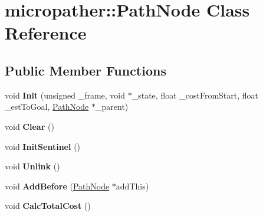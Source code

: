 \hypertarget{classmicropather_1_1_path_node}{\section{micropather\-:\-:Path\-Node Class Reference}
\label{classmicropather_1_1_path_node}
}
\subsection*{Public Member Functions}
\begin{DoxyCompactItemize}
\item 
\hypertarget{classmicropather_1_1_path_node_a7a0c5d4f08124f71a57a78e83d391e90}{void {\bfseries Init} (unsigned \-\_\-frame, void $\ast$\-\_\-state, float \-\_\-cost\-From\-Start, float \-\_\-est\-To\-Goal, \hyperlink{classmicropather_1_1_path_node}{Path\-Node} $\ast$\-\_\-parent)}\label{classmicropather_1_1_path_node_a7a0c5d4f08124f71a57a78e83d391e90}

\item 
\hypertarget{classmicropather_1_1_path_node_ad31a34faeda2328e58530651d6e6a690}{void {\bfseries Clear} ()}\label{classmicropather_1_1_path_node_ad31a34faeda2328e58530651d6e6a690}

\item 
\hypertarget{classmicropather_1_1_path_node_a55b34c58ec9a8505750ebc69d910d605}{void {\bfseries Init\-Sentinel} ()}\label{classmicropather_1_1_path_node_a55b34c58ec9a8505750ebc69d910d605}

\item 
\hypertarget{classmicropather_1_1_path_node_a3b8f16adf954ddcd36233107dc9246b0}{void {\bfseries Unlink} ()}\label{classmicropather_1_1_path_node_a3b8f16adf954ddcd36233107dc9246b0}

\item 
\hypertarget{classmicropather_1_1_path_node_a3f6281dc3223e4a500b0e2f5f984180e}{void {\bfseries Add\-Before} (\hyperlink{classmicropather_1_1_path_node}{Path\-Node} $\ast$add\-This)}\label{classmicropather_1_1_path_node_a3f6281dc3223e4a500b0e2f5f984180e}

\item 
\hypertarget{classmicropather_1_1_path_node_aaf9be0cd9e8512b6500b8d5d7b9ecd34}{void {\bfseries Calc\-Total\-Cost} ()}\label{classmicropather_1_1_path_node_aaf9be0cd9e8512b6500b8d5d7b9ecd34}

\end{DoxyCompactItemize}
